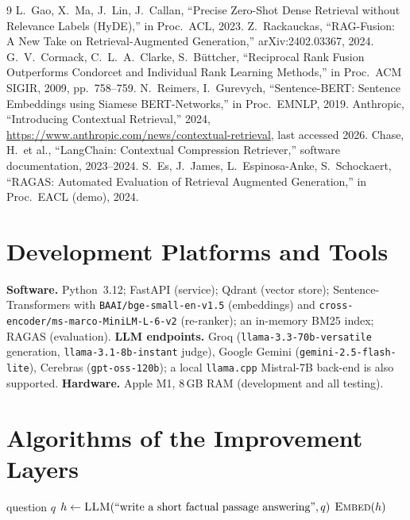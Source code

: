 \documentclass[12pt,a4paper]{report}
\begin{document}
\begin{thebibliography}{9}
\small
{} L.\ Gao, X.\ Ma, J.\ Lin, J.\ Callan, ``Precise Zero-Shot Dense
Retrieval without Relevance Labels (HyDE),'' in Proc.\ ACL, 2023.
 Z.\ Rackauckas, ``RAG-Fusion: A New Take on
Retrieval-Augmented Generation,'' arXiv:2402.03367, 2024.
 G.\ V.\ Cormack, C.\ L.\ A.\ Clarke, S.\ B\"uttcher, ``Reciprocal
Rank Fusion Outperforms Condorcet and Individual Rank Learning Methods,'' in
Proc.\ ACM SIGIR, 2009, pp.\ 758--759.
 N.\ Reimers, I.\ Gurevych, ``Sentence-BERT: Sentence Embeddings
using Siamese BERT-Networks,'' in Proc.\ EMNLP, 2019.
 Anthropic, ``Introducing Contextual Retrieval,'' 2024,
\url{https://www.anthropic.com/news/contextual-retrieval}, last accessed 2026.
 Chase, H.\ et al., ``LangChain: Contextual Compression
Retriever,'' software documentation, 2023--2024.
 S.\ Es, J.\ James, L.\ Espinosa-Anke, S.\ Schockaert, ``RAGAS:
Automated Evaluation of Retrieval Augmented Generation,'' in Proc.\ EACL (demo),
2024.
\end{thebibliography}

\appendix
\chapter{Development Platforms and Tools}
\textbf{Software.} Python~3.12; FastAPI (service); Qdrant (vector store);
Sentence-Transformers with \texttt{BAAI/bge-small-en-v1.5} (embeddings) and
\texttt{cross-encoder/ms-marco-MiniLM-L-6-v2} (re-ranker); an in-memory BM25
index; RAGAS (evaluation). \textbf{LLM endpoints.} Groq
(\texttt{llama-3.3-70b-versatile} generation, \texttt{llama-3.1-8b-instant}
judge), Google Gemini (\texttt{gemini-2.5-flash-lite}), Cerebras
(\texttt{gpt-oss-120b}); a local \texttt{llama.cpp} Mistral-7B back-end is also
supported. \textbf{Hardware.} Apple M1, 8\,GB RAM (development and all testing).

\chapter{Algorithms of the Improvement Layers}

\begin{algorithm}[H]
\caption{HyDE query expansion}\label{alg:hyde}
\begin{algorithmic}[1]
\Require question $q$
\State $h \gets \textsc{LLM}(\text{``write a short factual passage answering''}, q)$
\State \Return $\textsc{Embed}(h)$ 
\end{algorithmic}
\end{algorithm}
\end{document}
